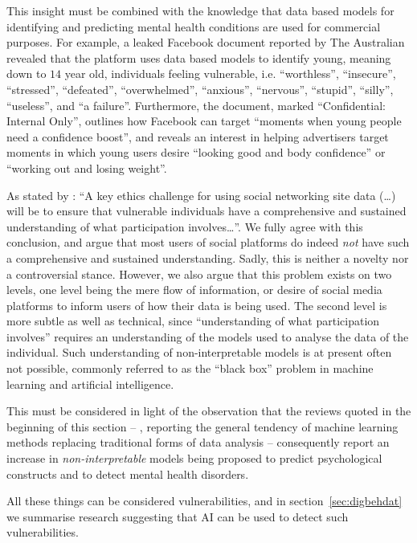 \documentclass[11pt,theapa]{article}
\theoremstyle{plain}
\begin{document}
This insight must be combined with the knowledge that data based models for identifying and predicting mental health conditions are used for commercial purposes. For example, a leaked Facebook document reported by The Australian \cite{arstechnica_teens2017} revealed that the platform uses data based models to identify young, meaning down to $14$ year old, individuals feeling vulnerable, i.e. ``worthless'', ``insecure'', ``stressed'', ``defeated'', ``overwhelmed'', ``anxious'', ``nervous'', ``stupid'', ``silly'', ``useless'', and ``a failure''. Furthermore, the document, marked ``Confidential: Internal Only'', outlines how Facebook can target ``moments when young people need a confidence boost'', and reveals an interest in helping advertisers target moments in which young users desire ``looking good and body confidence'' or ``working out and losing weight''.

As stated by \cite{inkster2016decade}: ``A key ethics challenge for using social networking site data (\dots) will be to ensure that vulnerable individuals have a comprehensive and sustained understanding of what participation involves\dots''. We fully agree with this conclusion, and argue that most users of social platforms do indeed \textit{not} have such a comprehensive and sustained understanding. Sadly, this is neither a novelty nor a controversial stance. However, we also argue that this problem exists on two levels, one level being the mere flow of information, or desire of social media platforms to inform users of how their data is being used. The second level is more subtle as well as technical, since ``understanding of what participation involves'' requires an understanding of the models used to analyse the data of the individual. Such understanding of non-interpretable models is at present often not possible, commonly referred to as the ``black box'' problem in machine learning and artificial intelligence.

This must be considered in light of the observation that the reviews quoted in the beginning of this section -- \cite{wongkoblap2017researching,aboureihanimohammadi2020identification}, reporting the general tendency of machine learning methods replacing traditional forms of data analysis -- consequently report an increase in \textit{non-interpretable} models being proposed to predict psychological constructs and to detect mental health disorders.


All these things can be considered vulnerabilities, and in section~\ref{sec:digbehdat} we summarise research suggesting that AI can be used to detect such vulnerabilities.
\end{document}
